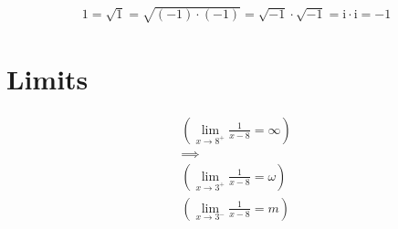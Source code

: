 \documentclass{article}
\newcommand{\iu}{\mathrm{i}} %
\begin{document}
\begin{equation}
	\begin{split}
		1 = \sqrt{1} = \sqrt{(-1)\cdot(-1)} = \sqrt{-1}\cdot \sqrt{-1} = \iu \cdot \iu = -1
	\end{split}
\end{equation}

\section{Limits}

\begin{equation}
	\begin{split}
		(\lim_{x\to8^+}\frac{1}{x-8} = \infty) \\
		\implies \\
		(\lim_{x\to3^+}\frac{1}{x-8} = \omega) \\
		(\lim_{x\to3^-}\frac{1}{x-8} = m)
	\end{split}
\end{equation}

\nocite{*}
\printbibliography[heading=bibintoc]
\end{document}

